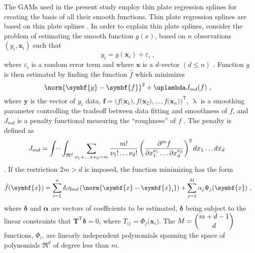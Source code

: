 The GAMs used in the present study employ thin plate regression splines \parencite{Wood2003} for creating the basis of all their smooth functions.  Thin plate regression splines are based on thin plate splines \parencite{Duchon1977}.  In order to explain thin plate splines, consider the problem of estimating the smooth function \(g(x)\), based on \(n\) observations \((y_i, \symbf{x}_i)\) such that
\begin{equation}
  \label{eq:ThinPlateSplinesModel}
  y_i = g(\symbf{x}_i) + \varepsilon_i~,
\end{equation}
where \(\varepsilon_i\) is a random error term and where \(\symbf{x}\) is a \(d\)-vector \((d \leq n)\) \parencite{Wood2006}.  Function \(g\) is then estimated by finding the function \(\hat{f}\) which minimizes
\begin{equation}
  \label{eq:ThinPlateSplinesTermToMinimize}
  \norm{\symbf{y} - \symbf{f}}^2 + \uplambda J_{md}(f)~,
\end{equation}
where \(\symbf{y}\) is the vector of \(y_i\) data, \(\symbf{f} = \bigl(f\bigl(\symbf{x}_1\bigr), f\bigl(\symbf{x}_2\bigr), \ldots, f\bigl(\symbf{x}_n\bigr)\bigr)^{\text{T}}\), \(\uplambda\) is a smoothing parameter controlling the tradeoff between data fitting and smoothness of \(f\), and \(J_{md}\) is a penalty functional measuring the ``roughness'' of \(f\) \parencite{Wood2006}.  The penalty is defined as
\begin{equation}
  \label{eq:ThinPlateSplinesPenalty}
  J_{md} = \int{\hspace{-3mm}}\cdots\int_{\mathfrak{R}^d} \sum_{\nu_1 + \ldots + \nu_d = m}\frac{m!}{\nu_1! \ldots \nu_d!} \left(\frac{\partial^mf}{\partial x_1^{\nu_1} \ldots \partial x_d^{\nu_d}}\right)^2 dx_1 \ldots dx_d~
\end{equation}
\parencite{Wood2006}.  If the restriction \(2m > d\) is imposed, the function minimizing  has the form
\begin{equation}
  \label{eq:ThinPlateSplinesMinimizingFunctionForm}
  \hat{f}(\symbf{x}) = \sum_{i = 1}^n \delta_i\eta_{md}\left(\norm{\symbf{x} - \symbf{x}_i}\right) + \sum_{j = 1}^M\alpha_j\Phi_j(\symbf{x})~,
\end{equation}
where \(\symbf{\delta}\) and \(\symbf{\alpha}\) are vectors of coefficients to be estimated, \(\symbf{\delta}\) being subject to the linear constraints that \(\symbf{T}^{\text{T}}\symbf{\delta} = 0\), where \(T_{ij} = \Phi_j\bigl(\symbf{x}_i\bigr)\).
The \(M = \dbinom{m + d - 1}{d}\) functions, \(\Phi_i\), are linearly independent polynomials spanning the space of polynomials \(\mathfrak{R}^d\) of degree less than \(m\).  %
